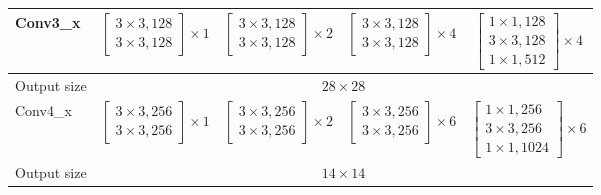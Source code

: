 \begin{table}[h]
{\begin{tabular}{l|c|c|c|c}
		\hline
		
		Conv3\_x 
		& $\left[\begin{array}{l} 3\times3, 128 \\ 3\times3, 128 \end{array}\right] \times 1$
		& $\left[\begin{array}{l} 3\times3, 128 \\ 3\times3, 128 \end{array}\right] \times 2$
		& $\left[\begin{array}{l} 3\times3, 128 \\ 3\times3, 128 \end{array}\right] \times 4$
		& $\left[\begin{array}{l} 1\times1, 128 \\ 3\times3, 128 \\ 1\times1, 512 \end{array}\right] \times 4$ \\
		
		\hline
		
		Output size 
		& \multicolumn{4}{c}{$28 \times 28$} \\
		
		\hline
		
		Conv4\_x 
		& $\left[\begin{array}{l} 3\times3, 256 \\ 3\times3, 256 \end{array}\right] \times 1$
		& $\left[\begin{array}{l} 3\times3, 256 \\ 3\times3, 256 \end{array}\right] \times 2$
		& $\left[\begin{array}{l} 3\times3, 256 \\ 3\times3, 256 \end{array}\right] \times 6$
		& $\left[\begin{array}{l} 1\times1, 256 \\ 3\times3, 256 \\ 1\times1, 1024 \end{array}\right] \times 6$ \\
		
		\hline
		
		Output size 
		& \multicolumn{4}{c}{$14 \times 14$} \\
		
		\hline
		

\end{tabular}}
\end{table}
